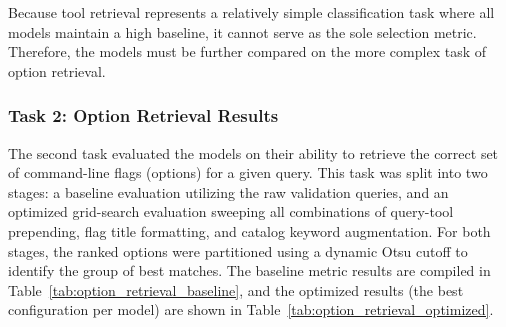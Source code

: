 Because tool retrieval represents a relatively simple classification task where all models maintain a high baseline, it cannot serve as the sole selection metric. Therefore, the models must be further compared on the more complex task of option retrieval.

\subsubsection{Task 2: Option Retrieval Results}

The second task evaluated the models on their ability to retrieve the correct set of command-line flags (options) for a given query. This task was split into two stages: a baseline evaluation utilizing the raw validation queries, and an optimized grid-search evaluation sweeping all combinations of query-tool prepending, flag title formatting, and catalog keyword augmentation. For both stages, the ranked options were partitioned using a dynamic Otsu cutoff to identify the group of best matches. The baseline metric results  are compiled in Table~\ref{tab:option_retrieval_baseline}, and the optimized results (the best configuration per model) are shown in Table~\ref{tab:option_retrieval_optimized}.

\FloatBarrier
\begin{table}[htbp]
\centering
\caption{Task 2: Option Retrieval Baseline Results (No Optimizations)}
\label{tab:option_retrieval_baseline}
\end{table}
\FloatBarrier

